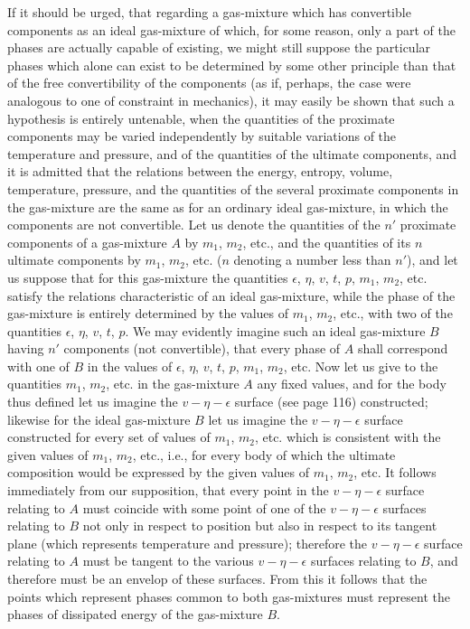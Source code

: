\documentclass[12pt]{memoir}
\begin{document}
If it should be urged, that regarding a gas-mixture which has convertible components as an ideal gas-mixture of which, for some reason, only a part of the phases are actually capable of existing, we might still suppose the particular phases which alone can exist to be determined by some other principle than that of the free convertibility of the components (as if, perhaps, the case were analogous to one of constraint in mechanics), it may easily be shown that such a hypothesis is entirely untenable, when the quantities of the proximate components may be varied independently by suitable variations of the temperature and pressure, and of the quantities of the ultimate components, and it is admitted that the relations between the energy, entropy, volume, temperature, pressure, and the quantities of the several proximate components in the gas-mixture are the same as for an ordinary ideal gas-mixture, in which the components are not convertible. Let us denote the quantities of the $n'$ proximate components of a gas-mixture $A$ by $m_1$, $m_2$, etc., and the quantities of its $n$ ultimate components by $m_1$, $m_2$, etc. ($n$ denoting a number less than $n'$), and let us suppose that for this gas-mixture the quantities $\epsilon$, $\eta$, $v$, $t$, $p$, $m_1$, $m_2$, etc. satisfy the relations characteristic of an ideal gas-mixture, while the phase of the gas-mixture is entirely determined by the values of $m_1$, $m_2$, etc., with two of the quantities $\epsilon$, $\eta$, $v$, $t$, $p$. We may evidently imagine such an ideal gas-mixture $B$ having $n'$ components (not convertible), that every phase of $A$ shall correspond with one of $B$ in the values of $\epsilon$, $\eta$, $v$, $t$, $p$, $m_1$, $m_2$, etc. Now let us give to the quantities $m_1$, $m_2$, etc. in the gas-mixture $A$ any fixed values, and for the body thus defined let us imagine the $v\!-\eta\!-\epsilon$ surface (see page 116) constructed; likewise for the ideal gas-mixture $B$ let us imagine the $v\!-\eta\!-\epsilon$ surface constructed for every set of values of $m_1$, $m_2$, etc. which is consistent with the given values of $m_1$, $m_2$, etc., i.e., for every body of which the ultimate composition would be expressed by the given values of $m_1$, $m_2$, etc. It follows immediately from our supposition, that every point in the $v\!-\eta\!-\epsilon$ surface relating to $A$ must coincide with some point of one of the $v\!-\eta\!-\epsilon$ surfaces relating to $B$ not only in respect to position but also in respect to its tangent plane (which represents temperature and pressure); therefore the $v\!-\eta\!-\epsilon$ surface relating to $A$ must be tangent to the various $v\!-\eta\!-\epsilon$ surfaces relating to $B$, and therefore must be an envelop of these surfaces. From this it follows that the points which represent phases common to both gas-mixtures must represent the phases of dissipated energy of the gas-mixture $B$.
\end{document}
